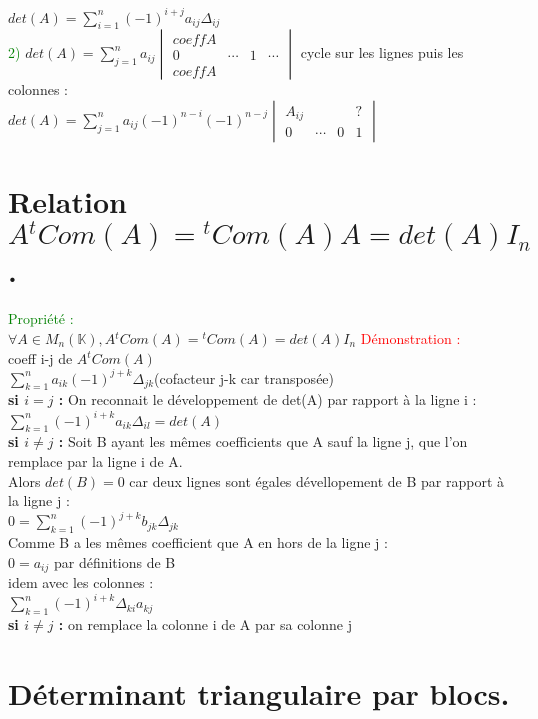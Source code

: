 \documentclass{article}
\begin{document}
    $det(A)=\sum_{i=1}^n (-1)^{i+j} a_{ij} \Delta_{ij}$ \\
    \textcolor{green}{2)} $det(A)= \sum_{j=1}^n a_{ij} \begin{vmatrix} coeff A \\ 0 & \cdots & 1 & \cdots \\ coeff A \end{vmatrix}$
    cycle sur les lignes puis les colonnes  : \\
    $det(A)=\sum_{j=1}^n a_{ij} (-1)^{n-i}(-1)^{n-j} \begin{vmatrix}A_{ij} & &  & ? \\ 0 & \cdots & 0 & 1\end{vmatrix}$
      
      \section{Relation $A {}^tCom(A)={}^tCom(A)A=det(A)I_n$.}
      \textcolor{green}{Propriété :} \\
      $\forall A \in M_n(\mathbb K),  A {}^t Com(A)= {}^t Com(A)= det(A)I_n$
      \textcolor{red}{Démonstration : } \\
      coeff i-j de $A{}^t Com(A)$ \\
      $\sum_{k=1}^n a_{ik} (-1)^{j+k} \Delta_{jk}$(cofacteur j-k car transposée) \\
      {\bf si \boldmath $i = j$ :} On reconnait le développement de det(A) par rapport à la ligne i : \\
      $\sum_{k=1}^n (-1)^{i+k}a_{ik}\Delta_{il}=det(A)$ \\
      {\bf si \boldmath $i \neq j$ :} Soit B ayant les mêmes coefficients  que A sauf la ligne j, que l'on remplace par la ligne i de A. \\
      Alors $det(B) = 0$ car deux lignes sont égales dévellopement de B par rapport à la ligne j : \\
      $0=\sum_{k=1}^n (-1)^{j+k} b_{jk} \Delta_{jk}$ \\
      Comme B a les mêmes coefficient que A en hors de la ligne j : \\
      $0=a_{ij}$ par définitions de B \\
      idem avec les colonnes : \\
      $\sum_{k=1}^n (-1)^{i+k} \Delta_{ki} a_{kj}$ \\
      {\bf \boldmath si $i\neq j$ :} on remplace la colonne i de A par sa colonne j
\section{Déterminant triangulaire par blocs.}
\end{document}
